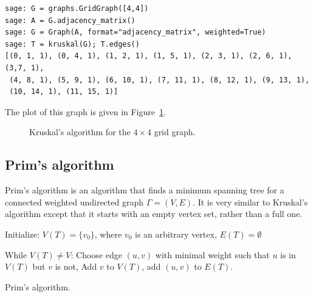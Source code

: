 \begin{lstlisting}
sage: G = graphs.GridGraph([4,4])
sage: A = G.adjacency_matrix()
sage: G = Graph(A, format="adjacency_matrix", weighted=True)
sage: T = kruskal(G); T.edges()
[(0, 1, 1), (0, 4, 1), (1, 2, 1), (1, 5, 1), (2, 3, 1), (2, 6, 1), (3,7, 1),
 (4, 8, 1), (5, 9, 1), (6, 10, 1), (7, 11, 1), (8, 12, 1), (9, 13, 1),
 (10, 14, 1), (11, 15, 1)]
\end{lstlisting}
%
The plot of this graph is given in
Figure~\ref{fig:trees-forests:Kruskal_example}.

\begin{figure}[!htbp]
\centering
{}
\caption{Kruskal's algorithm for the $4\times 4$ grid graph.}
\label{fig:trees-forests:Kruskal_example}
\end{figure}

\subsection{Prim's algorithm}

Prim's algorithm is an algorithm that finds a minimum spanning tree
for a connected weighted
undirected graph $\Gamma=(V,E)$. It is very similar to Kruskal's
algorithm except that it starts with an empty vertex set, rather than
a full one.



\begin{algorithm}[!htpb]
\dontprintsemicolon  %
\BlankLine
Initialize: $V(T) = \{v_0\}$, where $v_0$ is an arbitrary vertex, $E(T)=\emptyset$ \;

While $V(T)\not= V$:\;
{
\quad Choose edge $(u,v)$ with minimal weight such that $u$ is in $V(T)$
but $v$ is not,\;
\quad Add $v$ to $V(T)$, add $(u, v)$ to $E(T)$.\;
}

\caption{Prim's algorithm.}
\label{alg:tree-forest:prim}
\end{algorithm}

